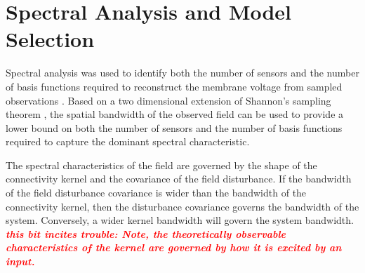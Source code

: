 \documentclass[twocolumn,11pt,a4paper]{article}		%
\newcommand{\wtf}[1]{\textsf{\emph{\textbf{\textcolor{red}{#1}}}}}
\begin{document}
\section{Spectral Analysis and Model Selection}\label{SpectralAnalysisSection} Spectral analysis was used to identify both the number of sensors and the number of basis functions required to reconstruct the membrane voltage from sampled observations \cite{Sanner1992,Scerri2009}. Based on a two dimensional extension of Shannon's sampling theorem \cite{Peterson1962}, the spatial bandwidth of the observed field can be used to provide a lower bound on both the number of sensors and the number of basis functions required to capture the dominant spectral characteristic.

The spectral characteristics of the field are governed by the shape of the connectivity kernel and the covariance of the field disturbance. If the bandwidth of the field disturbance covariance is wider than the bandwidth of the connectivity kernel, then the disturbance covariance governs the bandwidth of the system. Conversely, a wider kernel bandwidth will govern the system bandwidth. \wtf{this bit incites trouble: Note, the theoretically observable characteristics of the kernel are governed by how it is excited by an input.}
\end{document}
